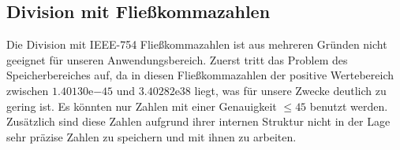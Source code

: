 \documentclass[course=erap]{aspdoc}
\begin{document}
    \subsection{Division mit Fließkommazahlen}
    Die Division mit IEEE-754 Fließkommazahlen ist aus mehreren Gründen nicht geeignet für unseren Anwendungsbereich. Zuerst tritt das Problem des Speicherbereiches auf, da in diesen Fließkommazahlen der positive Wertebereich zwischen $1.40130\mathrm{e}{-45}$ und $3.40282\mathrm{e}{38}$ liegt, was für unsere Zwecke deutlich zu gering ist. Es könnten nur Zahlen mit einer Genauigkeit \begin{math}
                                                                                                                                                                                                                                                                                                                                                                                                     \leq 45
    \end{math} benutzt werden. Zusätzlich sind diese Zahlen aufgrund ihrer internen Struktur
    nicht in der Lage sehr präzise Zahlen zu speichern und mit ihnen zu arbeiten.
\end{document}
